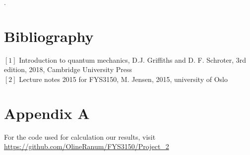 \documentclass[%
reprint,
amsmath,amssymb,
aps,
]{revtex4-1}
\begin{document}
\newpage .
\newpage 
\onecolumngrid
\section*{Bibliography}
\noindent $[1]$ Introduction to quantum mechanics, D.J. Griffiths and D. F. Schroter, 3rd edition, 2018, Cambridge University Press\\ 
$[2]$ Lecture notes 2015 for FYS3150, M. Jensen, 2015, university of Oslo
\section*{Appendix A}
For the code used for calculation our results, visit
\url{https://github.com/OlineRanum/FYS3150/Project_2}
\end{document}
